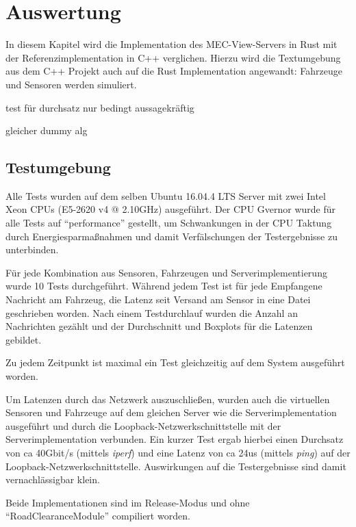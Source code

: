 
			
\chapter{Auswertung}

In diesem Kapitel wird die Implementation des MEC-View-Servers in Rust mit der Referenzimplementation in C++ verglichen.
Hierzu wird die Textumgebung aus dem C++ Projekt auch auf die Rust Implementation angewandt: Fahrzeuge und Sensoren werden simuliert.

test für durchsatz nur bedingt aussagekräftig

gleicher dummy alg


\section{Testumgebung}

Alle Tests wurden auf dem selben Ubuntu 16.04.4 LTS Server mit zwei Intel Xeon CPUs (E5-2620 v4 @ 2.10GHz) ausgeführt.
Der CPU Gvernor wurde für alle Tests auf \enquote{performance} gestellt, um Schwankungen in der CPU Taktung durch Energiesparmaßnahmen und damit Verfälschungen der Testergebnisse zu unterbinden.

Für jede Kombination aus Sensoren, Fahrzeugen und Serverimplementierung wurde 10 Tests durchgeführt.
Während jedem Test ist für jede Empfangene Nachricht am Fahrzeug, die Latenz seit Versand am Sensor in eine Datei geschrieben worden.
Nach einem Testdurchlauf wurden die Anzahl an Nachrichten gezählt und der Durchschnitt und Boxplots für die Latenzen gebildet.

Zu jedem Zeitpunkt ist maximal ein Test gleichzeitig auf dem System ausgeführt worden.

Um Latenzen durch das Netzwerk auszuschließen, wurden auch die virtuellen Sensoren und Fahrzeuge auf dem gleichen Server wie die Serverimplementation ausgeführt und durch die Loopback-Netzwerkschnittstelle mit der Serverimplementation verbunden.
Ein kurzer Test ergab hierbei einen Durchsatz von ca 40Gbit/s (mittels \textit{iperf}) und eine Latenz von ca 24us (mittels \textit{ping}) auf der Loopback-Netzwerkschnittstelle.
Auswirkungen auf die Testergebnisse sind damit vernachlässigbar klein.

Beide Implementationen sind im Release-Modus und ohne \enquote{RoadClearanceModule} compiliert worden.

